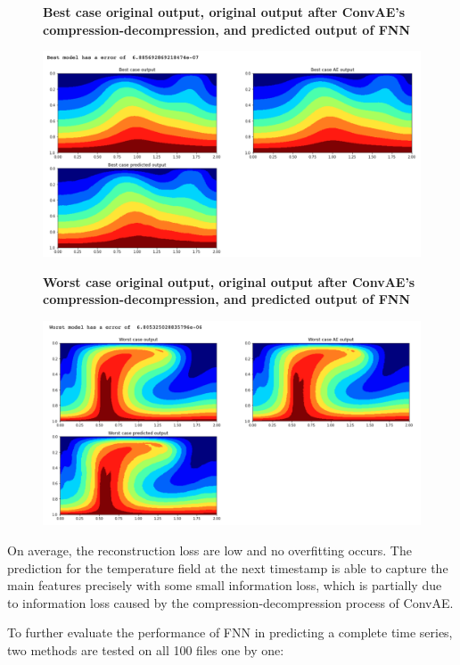 \begin{figure}[H]
    \textbf{Best case original output, original output after ConvAE's compression-decompression, and predicted output of FNN}\par\medskip
    \includegraphics[scale=0.5]{Report LaTeX/figures/mantle_convection_images/FNN_Best.png}
\end{figure}

\begin{figure}[H]
    \textbf{Worst case original output, original output after ConvAE's compression-decompression, and predicted output of FNN}\par\medskip
    \includegraphics[scale=0.5]{Report LaTeX/figures/mantle_convection_images/FNN_Worst.png}
\end{figure}

On average, the reconstruction loss are low and no overfitting occurs. The prediction for the temperature field at the next timestamp is able to capture the main features precisely with some small information loss, which is partially due to information loss caused by the compression-decompression process of ConvAE.

To further evaluate the performance of FNN in predicting a complete time series, two methods are tested on all 100 files one by one: 

